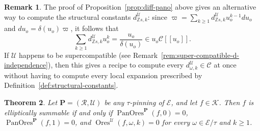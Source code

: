 \documentclass[preprint,12pt]{elsarticle}
\numberwithin{equation}{section} %
\theoremstyle{theorem}
\newtheorem{theorem}{Theorem}[section]
\theoremstyle{definition}
\newtheorem{remark}[theorem]{Remark}
\newcommand{\Ca}{\mathcal{C}} %
\newcommand{\bk}{\mathcal{K}} %
\newcommand{\bke}{{\bk}} %
\newcommand{\ec}{\mathcal{E}} %
\newcommand{\idec}{{o}} %
\newcommand{\orbita}{{\ec/\tau}} %
\newcommand{\Z}{\mathbb{Z}} %
\DeclareMathOperator{\ores}{Ores}
\DeclareMathOperator{\pano}{PanOres}
\begin{document}
\begin{remark}\label{rem:diff-pano} The proof of Proposition~\ref{prop:diff-pano} above gives an alternative way to compute the structural constants $d^\mathcal{U}_{\Z s,k}$: since $\varpi=\sum_{k\geq 1}d^\mathcal{U}_{\Z s,k}u_\idec^{k-1}du_\idec$ and $du_\idec=\delta(u_\idec)\varpi$, it follows that \[\sum_{k\geq 1}d^\mathcal{U}_{\Z s,k}u_\idec^{k}=\frac{u_\idec}{\delta(u_\idec)}\in u_\idec\Ca[[u_\idec]].\] If $\mathcal{U}$ happens to be supercompatible (see Remark~\ref{rem:super-compatible-d-independence}), then this gives a recipe to compute every $d^\mathcal{U}_{\omega,k}\in\Ca$ at once without having to compute every local expansion prescribed by Definition~\ref{def:structural-constants}.    
\end{remark}

\begin{theorem}\label{thm:maina} Let $\mathbf{P}=(\mathcal{R},\mathcal{U})$ be any $\tau$-pinning of $\ec$, and let $f\in\bke$. Then $f$ is elliptically summable if and only if $\pano^{\mathbf{P}}(f,0)=0$, $\pano^{\mathbf{P}}(f,1)=0$, and $\ores^{\mathcal{U}}(f,\omega,k)=0$ for every $\omega\in\orbita$ and $k\geq 1$.
\end{theorem}
\end{document}
